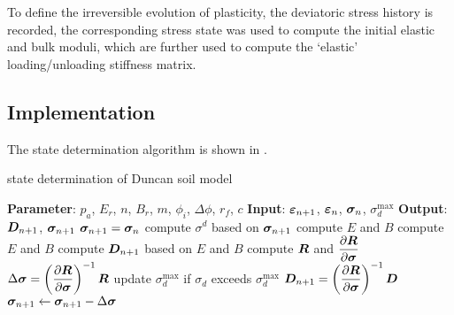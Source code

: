 To define the irreversible evolution of plasticity, the deviatoric stress history is recorded, the corresponding stress state was used to compute the initial elastic and bulk moduli, which are further used to compute the `elastic' loading/unloading stiffness matrix.
\subsection{Implementation}
The state determination algorithm is shown in .
\begin{breakablealgorithm}
\caption{state determination of Duncan soil model}\label{algo:duncan_model}
\begin{algorithmic}
\State \textbf{Parameter}: $p_a$, $E_r$, $n$, $B_r$, $m$, $\phi_i$, $\Delta\phi$, $r_f$, $c$
\State \textbf{Input}: $\bm{\varepsilon}_{n+1}$, $\bm{\varepsilon}_n$, $\bm{\sigma}_n$, $\sigma_d^{\text{max}}$
\State \textbf{Output}: $\bm{D}_{n+1}$, $\bm{\sigma}_{n+1}$
\State $\bm{\sigma}_{n+1}=\bm{\sigma}_n$
\State compute $\sigma^d$ based on $\bm{\sigma}_{n+1}$
\State compute $E$ and $B$
\Else
\State compute $E$ and $B$
\EndIf
\State compute $\bm{D}_{n+1}$ based on $E$ and $B$
\State compute $\bm{R}$ and $\dfrac{\partial{\bm{R}}}{\partial{\bm{\sigma}}}$
\State $\Delta\bm{\sigma}=\left(\dfrac{\partial{\bm{R}}}{\partial{\bm{\sigma}}}\right)^{-1}\bm{R}$
\State update $\sigma_d^{\text{max}}$ if $\sigma_d$ exceeds $\sigma_d^{\text{max}}$
\State $\bm{D}_{n+1}=\left(\dfrac{\partial{\bm{R}}}{\partial{\bm{\sigma}}}\right)^{-1}\bm{D}$
\State \Return
\EndIf
\State $\bm{\sigma}_{n+1}\leftarrow\bm{\sigma}_{n+1}-\Delta\bm{\sigma}$
\EndWhile
\end{algorithmic}
\end{breakablealgorithm}

